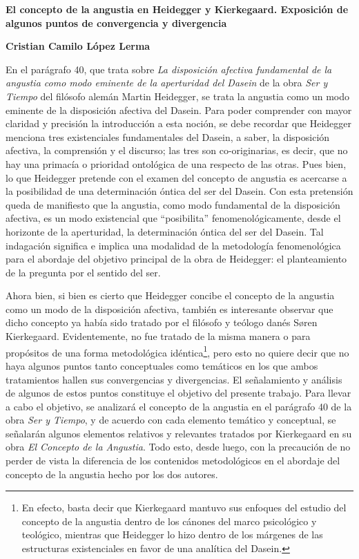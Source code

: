 \documentclass[]{article}
\date{}
\begin{document}
\textbf{El concepto de la angustia en Heidegger y Kierkegaard. Exposición de algunos puntos de convergencia y divergencia}

\textbf{Cristian Camilo López Lerma}

En el parágrafo 40, que trata sobre \emph{La disposición afectiva fundamental de la angustia como modo eminente de la aperturidad del Dasein} de la obra \emph{Ser y Tiempo} del filósofo alemán Martin Heidegger, se trata la angustia como un modo eminente de la disposición afectiva del Dasein. Para poder comprender con mayor claridad y precisión la introducción a esta noción, se debe recordar que Heidegger menciona tres existenciales fundamentales del Dasein, a saber, la disposición afectiva, la comprensión y el discurso; las tres son co-originarias, es decir, que no hay una primacía o prioridad ontológica de una respecto de las otras. Pues bien, lo que Heidegger pretende con el examen del concepto de angustia es acercarse a la posibilidad de una determinación óntica del ser del Dasein. Con esta pretensión queda de manifiesto que la angustia, como modo fundamental de la disposición afectiva, es un modo existencial que ``posibilita'' fenomenológicamente, desde el horizonte de la aperturidad, la determinación óntica del ser del Dasein. Tal indagación significa e implica una modalidad de la metodología fenomenológica para el abordaje del objetivo principal de la obra de Heidegger: el planteamiento de la pregunta por el sentido del ser.

Ahora bien, si bien es cierto que Heidegger concibe el concepto de la angustia como un modo de la disposición afectiva, también es interesante observar que dicho concepto ya había sido tratado por el filósofo y teólogo danés Søren Kierkegaard. Evidentemente, no fue tratado de la misma manera o para propósitos de una forma metodológica idéntica\footnote{En efecto, basta decir que Kierkegaard mantuvo sus enfoques del estudio del concepto de la angustia dentro de los cánones del marco psicológico y teológico, mientras que Heidegger lo hizo dentro de los márgenes de las estructuras existenciales en favor de una analítica del Dasein.}, pero esto no quiere decir que no haya algunos puntos tanto conceptuales como temáticos en los que ambos tratamientos hallen sus convergencias y divergencias. El señalamiento y análisis de algunos de estos puntos constituye el objetivo del presente trabajo. Para llevar a cabo el objetivo, se analizará el concepto de la angustia en el parágrafo 40 de la obra \emph{Ser y Tiempo}, y de acuerdo con cada elemento temático y conceptual, se señalarán algunos elementos relativos y relevantes tratados por Kierkegaard en su obra \emph{El Concepto de la Angustia}. Todo esto, desde luego, con la precaución de no perder de vista la diferencia de los contenidos metodológicos en el abordaje del concepto de la angustia hecho por los dos autores.
\end{document}
